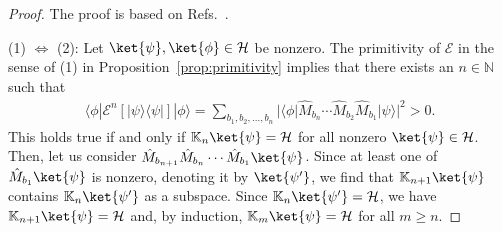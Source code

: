 \documentclass[preprint,pteplogo]{ptephy_v2}%
\numberwithin{equation}{section}
\theoremstyle{definition}
\newcommand{\mc}[1]{\mathcal{#1}}
\newcommand{\mbb}[1]{\mathbb{#1}}
\begin{document}
\begin{proof}
The proof is based on Refs.~\cite{wolf2012quantum, sanz2010quantum}.

(1) $\Leftrightarrow$ (2):
Let $\ket{\psi}, \ket{\phi} \in \mc{H}$ be nonzero. 
The primitivity of $\mc{E}$ in the sense of (1) in Proposition~\ref{prop:primitivity} implies that there exists an $n \in \mbb{N}$ such that
\begin{align}
\langle \phi | \mc{E}^n [|\psi \rangle \langle \psi|] | \phi \rangle = \sum_{b_1, b_2, \ldots, b_n} | \langle \phi | \hat{M}_{b_n} \cdots \hat{M}_{b_2} \hat{M}_{b_1} | \psi \rangle |^2 > 0.
\end{align}
This holds true if and only if $\mbb{K}_n \ket{\psi} = \mc{H}$ for all nonzero $\ket{\psi} \in \mc{H}$. 
Then, let us consider $\hat{M}_{b_{n+1}} \hat{M}_{b_n} \cdots \hat{M}_{b_1} \ket{\psi}$.
Since at least one of $\hat{M}_{b_1} \ket{\psi}$ is nonzero, denoting it by $\ket{\psi'}$, we find that $\mbb{K}_{n+1} \ket{\psi}$ contains $\mbb{K}_n \ket{\psi'}$ as a subspace.
Since $\mbb{K}_n \ket{\psi'} = \mc{H}$, we have $\mbb{K}_{n+1} \ket{\psi} = \mc{H}$ and, by induction, $\mbb{K}_m \ket{\psi} = \mc{H}$ for all $m \geq n$.


\end{proof}
\end{document}
